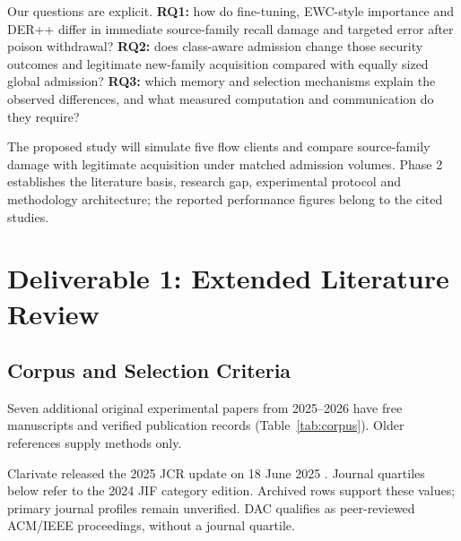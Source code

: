 \documentclass[10pt,a4paper]{article}
\begin{document}
Our questions are explicit. \textbf{RQ1:} how do fine-tuning, EWC-style importance and DER++ differ in immediate source-family recall damage and targeted error after poison withdrawal? \textbf{RQ2:} does class-aware admission change those security outcomes and legitimate new-family acquisition compared with equally sized global admission? \textbf{RQ3:} which memory and selection mechanisms explain the observed differences, and what measured computation and communication do they require?

The proposed study will simulate five flow clients and compare source-family damage with legitimate acquisition under matched admission volumes. Phase 2 establishes the literature basis, research gap, experimental protocol and methodology architecture; the reported performance figures belong to the cited studies.

\section{Deliverable 1: Extended Literature Review}
\subsection{Corpus and Selection Criteria}
Seven additional original experimental papers from 2025--2026 have free manuscripts and verified publication records (Table~\ref{tab:corpus}). Older references supply methods only.

Clarivate released the 2025 JCR update on 18 June 2025 \cite{clarivate}. Journal quartiles below refer to the 2024 JIF category edition. Archived rows support these values; primary journal profiles remain unverified. DAC qualifies as peer-reviewed ACM/IEEE proceedings, without a journal quartile.
\end{document}
